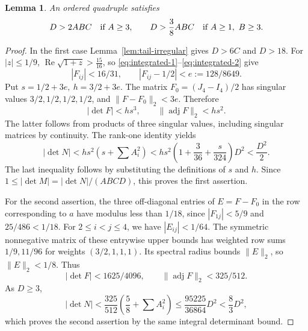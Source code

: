 \documentclass[12pt]{article}
\newtheorem{lemma}[theorem]{Lemma}
\numberwithin{equation}{section}
\begin{document}
\begin{lemma}\label{lem:product-four}
An ordered quadruple satisfies
\[
 D>2ABC\quad\hbox{if }A\ge3,\qquad
 D>\frac38ABC\quad\hbox{if }A\ge1,\ B\ge3.
\]
\end{lemma}
\begin{proof}
In the first case Lemma~\ref{lem:tail-irregular} gives \(D>6C\) and
\(D>18\). For \(|z|\le1/9\),
\(\operatorname{Re}\sqrt{1+z}>\frac{15}{16}\), so \eqref{eq:integrated-1}--\eqref{eq:integrated-2} give
\[
 |F_{ij}|<16/31,\qquad |F_{ij}-1/2|<e:=128/8649.
\]
Put \(s=1/2+3e,\ h=3/2+3e\). The matrix \(F_0=(J_4-I_4)/2\)
has singular values \(3/2,1/2,1/2,1/2\), and
\(\|F-F_0\|_2<3e\). Therefore
\[
 |\det F|<hs^3,\qquad \|\operatorname{adj}F\|_2<hs^2.
\]
The latter follows from products of three singular values, including
singular matrices by continuity. The rank-one identity yields
\[
 |\det N|<hs^2\left(s+\sum A_i^2\right)
 <hs^2\left(1+\frac3{36}+\frac{s}{324}\right)D^2<\frac{D^2}{2}.
\]
The last inequality follows by substituting the definitions of \(s\) and \(h\). Since
\(1\le|\det M|=|\det N|/(ABCD)\), this proves the first assertion.

For the second assertion, the three off-diagonal entries of \(E=F-F_0\)
in the row corresponding to \(a\) have modulus less than \(1/18\),
since \(|F_{1j}|<5/9\) and
\(25/486<1/18\). For \(2\le i<j\le4\), we have \(|E_{ij}|<1/64\).
The symmetric nonnegative matrix of these entrywise upper bounds has
weighted row sums \(1/9,11/96\) for weights \((3/2,1,1,1)\).
Its spectral radius bounds \(\|E\|_2\), so \(\|E\|_2<1/8\).
Thus
\[
 |\det F|<1625/4096,\qquad
 \|\operatorname{adj}F\|_2<325/512.
\]
As \(D\ge3\),
\[
 |\det N|<
 \frac{325}{512}\left(\frac58+\sum A_i^2\right)
 \le\frac{95225}{36864}D^2<\frac83D^2,
\]
which proves the second assertion by the same integral determinant bound.
\end{proof}
\end{document}

